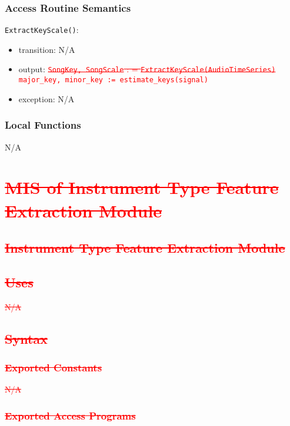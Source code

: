 \documentclass[12pt, titlepage]{article}
\begin{document}
\subsubsection{Access Routine Semantics}

\noindent \texttt{ExtractKeyScale()}:
\begin{itemize}
\item transition: N/A
\item output: \textcolor{red}{\st{\texttt{Song\textunderscore Key, Song\textunderscore Scale} : = \texttt{ExtractKeyScale(Audio\textunderscore Time\textunderscore Series)}}} \newline \textcolor{red}{\texttt{major\_key, minor\_key := estimate\_keys(signal)}}
\item exception: N/A
\end{itemize}

\subsubsection{Local Functions}
N/A

\section{\textcolor{red}{\sout{MIS of Instrument Type Feature Extraction Module}}} 

\subsection{\textcolor{red}{\sout{Instrument Type Feature Extraction Module}}}

\subsection{\textcolor{red}{\sout{Uses}}}
\textcolor{red}{\sout{N/A}}

\subsection{\textcolor{red}{\sout{Syntax}}}

\subsubsection{\textcolor{red}{\sout{Exported Constants}}}
\textcolor{red}{\sout{N/A}}

\subsubsection{\textcolor{red}{\sout{Exported Access Programs}}}
\end{document}
